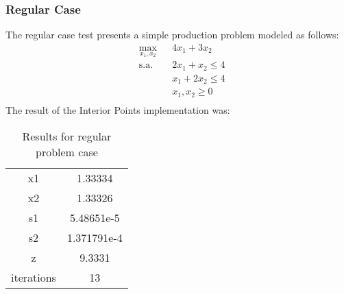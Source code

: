 \documentclass[a4paper]{IEEEtran}
\begin{document}
\subsubsection{Regular Case}
  The regular case test presents a simple production problem modeled as follows:
    \begin{equation}
        \begin{aligned}
            & \underset{x_1, x_2}{\text{max}}
            & & 4x_1 + 3x_2\\
            & \text{s.a.}
            & & 2x_1 + x_2 \leq 4 \\
            &&& x_1 + 2x_2 \leq 4 \\
            &&& x_1, x_2 \geq 0 \\
        \end{aligned}
    \end{equation}
 The result of the Interior Points implementation was:\\
        \begin{table}[H]
            \centering
            \begin{tabular}{c|c}
                 {x1} & 1.33334\\
                {x2} &  1.33326\\
                {s1} & 5.48651e-5\\
                {s2} & 1.371791e-4\\
                {z} & 9.3331\\
            iterations  & 13 \\
            \end{tabular}
            \caption{Results for regular problem case}
            \label{tab:1}
        \end{table}
\end{document}

